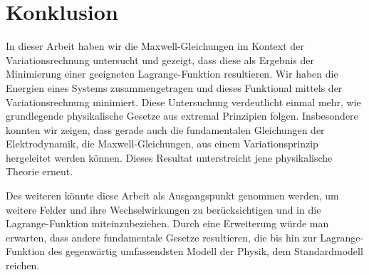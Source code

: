 %
%
%
%
\section{Konklusion}
In dieser Arbeit haben wir die Maxwell-Gleichungen im Kontext der Variationsrechnung untersucht und gezeigt, dass diese als Ergebnis der Minimierung einer geeigneten Lagrange-Funktion resultieren. Wir haben die Energien eines Systems zusammengetragen und dieses Funktional mittels der Variationsrechnung minimiert.
Diese Untersuchung verdeutlicht einmal mehr, wie grundlegende physikalische Gesetze aus extremal Prinzipien folgen. 
Insbesondere konnten wir zeigen, dass gerade auch die fundamentalen Gleichungen der Elektrodynamik, die Maxwell-Gleichungen, aus einem Variationsprinzip hergeleitet werden können. Dieses Resultat unterstreicht jene physikalische Theorie erneut. 

Des weiteren könnte diese Arbeit als Ausgangspunkt genommen werden, um weitere Felder und ihre Wechselwirkungen zu berücksichtigen und in die Lagrange-Funktion miteinzubeziehen. Durch eine Erweiterung würde man erwarten, dass andere fundamentale Gesetze resultieren, die bis hin zur Lagrange-Funktion des gegenwärtig umfassendsten Modell der Physik, dem Standardmodell reichen.
